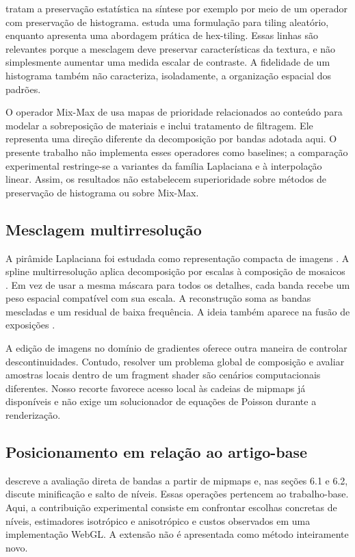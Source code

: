 \citet{heitz2018high} tratam a preservação estatística na síntese por exemplo por meio de um operador com preservação de histograma. \citet{burley2019histogram} estuda uma formulação para tiling aleatório, enquanto \citet{mikkelsen2022practical} apresenta uma abordagem prática de hex-tiling. Essas linhas são relevantes porque a mesclagem deve preservar características da textura, e não simplesmente aumentar uma medida escalar de contraste. A fidelidade de um histograma também não caracteriza, isoladamente, a organização espacial dos padrões.

O operador Mix-Max de \citet{fournier2024mixmax} usa mapas de prioridade relacionados ao conteúdo para modelar a sobreposição de materiais e inclui tratamento de filtragem. Ele representa uma direção diferente da decomposição por bandas adotada aqui. O presente trabalho não implementa esses operadores como baselines; a comparação experimental restringe-se a variantes da família Laplaciana e à interpolação linear. Assim, os resultados não estabelecem superioridade sobre métodos de preservação de histograma ou sobre Mix-Max.

\subsection{Mesclagem multirresolução}
A pirâmide Laplaciana foi estudada como representação compacta de imagens \citep{burt1983laplacian}. A spline multirresolução aplica decomposição por escalas à composição de mosaicos \citep{burt1983spline}. Em vez de usar a mesma máscara para todos os detalhes, cada banda recebe um peso espacial compatível com sua escala. A reconstrução soma as bandas mescladas e um residual de baixa frequência. A ideia também aparece na fusão de exposições \citep{mertens2007exposure}.

A edição de imagens no domínio de gradientes \citep{perez2003poisson} oferece outra maneira de controlar descontinuidades. Contudo, resolver um problema global de composição e avaliar amostras locais dentro de um fragment shader são cenários computacionais diferentes. Nosso recorte favorece acesso local às cadeias de mipmaps já disponíveis e não exige um solucionador de equações de Poisson durante a renderização.

\subsection{Posicionamento em relação ao artigo-base}
\citet{wronski2025laplacian} descreve a avaliação direta de bandas a partir de mipmaps e, nas seções 6.1 e 6.2, discute minificação e salto de níveis. Essas operações pertencem ao trabalho-base. Aqui, a contribuição experimental consiste em confrontar escolhas concretas de níveis, estimadores isotrópico e anisotrópico e custos observados em uma implementação WebGL. A extensão não é apresentada como método inteiramente novo.

